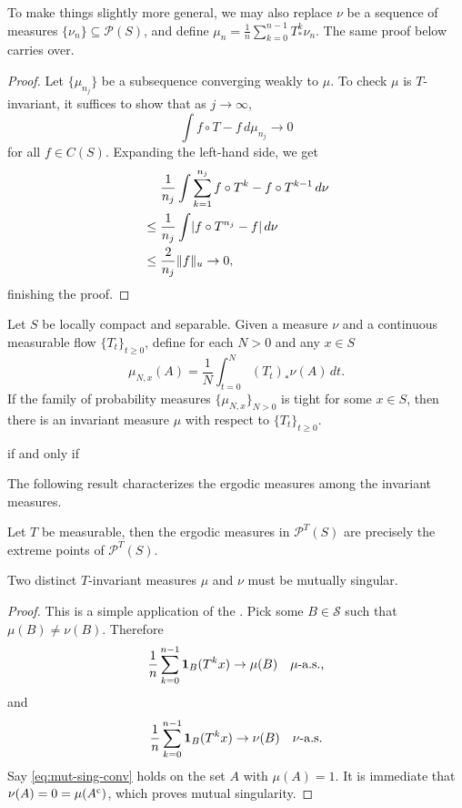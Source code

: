 To make things slightly more general, we may also replace $\nu$ be a sequence of measures $\{\nu_n\} \subseteq \mathcal P(S)$, and define $\mu_n =\frac{1}{n} \sum_{k=0}^{n-1} T_*^k \nu_n$. The same proof below carries over. 
\begin{proof}
    Let $\{\mu_{n_j}\}$ be a subsequence converging weakly to $\mu$. To check $\mu$ is $T$-invariant, it suffices to show that as $j \to \infty$, \[
        \int f\circ T - f\,d\mu_{n_j} \to 0
    \] for all $f \in C(S)$. Expanding the left-hand side, we get \begin{align*}
        & \phantom{{}={}} \frac{1}{n_j} \int \sum_{k=1}^{n_j} f\circ T^{k} - f\circ T^{k-1}\,d\nu \\
        & \leq \frac{1}{n_j} \int \abs{f\circ T^{n_j} - f}\,d\nu \\
        & \leq \frac{2}{n_j} \nm{f}_u \to 0,
    \end{align*} finishing the proof.
\end{proof}

\begin{namedthm}
    Let $S$ be locally compact and separable. Given a measure $\nu$ and a continuous measurable flow $\{T_t\}_{t\geq 0}$, define for each $N > 0$ and any $x \in S$ \[
        \mu_{N,x}(A) = \frac{1}{N}\int_{t=0}^{N} (T_t)_* \nu(A)\,dt.
    \] If the family of probability measures $\{\mu_{N,x}\}_{N > 0}$ is tight for some $x \in S$, then there is an invariant measure $\mu$ with respect to $\{T_t\}_{t\geq 0}$.
\end{namedthm}

     if and only if 

The following result characterizes the ergodic measures among the invariant measures.
\begin{thm}
    Let $T$ be measurable, then the ergodic measures in $\mathcal P^T(S)$ are precisely the extreme points of $\mathcal P^T(S)$.
\end{thm}

\begin{prop}
    Two distinct $T$-invariant measures $\mu$ and $\nu$ must be mutually singular.    
\end{prop}
\begin{proof}
    This is a simple application of the . Pick some $B \in \mathcal S$ such that $\mu(B) \neq \nu(B)$. Therefore \begin{equation}
        \frac{1}{n} \sum_{k=0}^{n-1} \ind_B (T^kx) \to \mu(B) \quad \mu\text{-a.s.,} \label{eq:mut-sing-conv}
    \end{equation} and \[
        \frac{1}{n} \sum_{k=0}^{n-1} \mathbf{1}_B(T^kx) \to \nu(B) \quad \nu\text{-a.s.}
    \] Say \eqref{eq:mut-sing-conv} holds on the set $A$ with $\mu(A) = 1$. It is immediate that $\nu(A) = 0 = \mu(A^{\mathrm{c}})$, which proves mutual singularity.
\end{proof}




